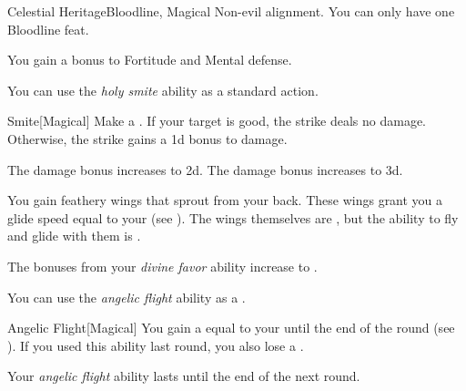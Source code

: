     \begin{feat}{Celestial Heritage}{Bloodline, Magical}
        \featpre Non-evil alignment.
         You can only have one Bloodline feat.

         You gain a  bonus to Fortitude and Mental defense.

         You can use the \textit{holy smite} ability as a standard action.
        \begin{freeability}{Smite}[Magical]
            Make a .
            If your target is good, the strike deals no damage.
            Otherwise, the strike gains a \plus1d bonus to damage.

            \rankline
             The damage bonus increases to \plus2d.
             The damage bonus increases to \plus3d.
        \end{freeability}

         You gain feathery wings that sprout from your back.
        These wings grant you a glide speed equal to your  (see ).
        The wings themselves are , but the ability to fly and glide with them is .

         The bonuses from your \textit{divine favor} ability increase to .

         You can use the \textit{angelic flight} ability as a .
        \begin{freeability}{Angelic Flight}[Magical]
            You gain a  equal to your  until the end of the round (see ).
            If you used this ability last round, you also lose a .
        \end{freeability}


         Your \textit{angelic flight} ability lasts until the end of the next round.
    \end{feat}

